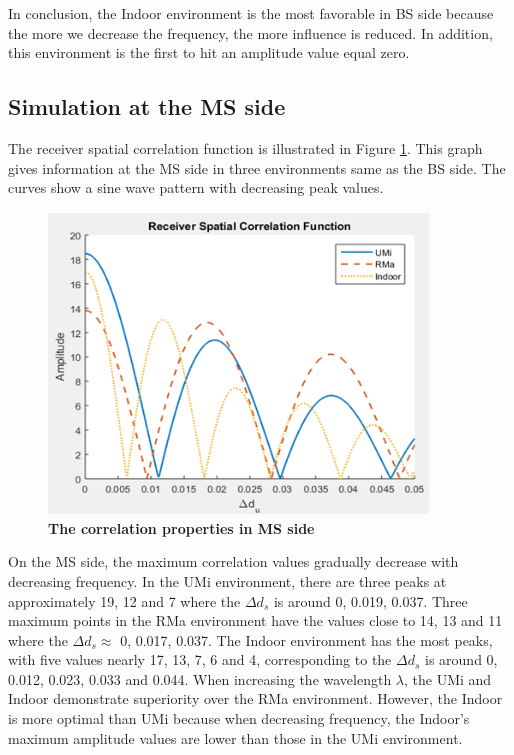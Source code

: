 \documentclass{article} %
\begin{document}
In conclusion, the Indoor environment is the most favorable in BS side because the more we decrease the frequency, the more influence is reduced. In addition, this environment is the first to hit an amplitude value equal zero.

\subsection{Simulation at the MS side}
The receiver spatial correlation function is illustrated in Figure \ref{figure3}. This graph gives information at the MS side in three environments same as the BS side. The curves show a sine wave pattern with decreasing peak values.

\begin{figure}[!ht]
    \centering
    \includegraphics[height=8cm]{Images/figure3.png}
    \caption[The correlation properties in MS side~\cite{final_exam}]{\bfseries \fontsize{12pt}{0pt}\selectfont The correlation properties in MS side~\cite{final_exam}}
    \label{figure3}
\end{figure}

On the MS side, the maximum correlation values gradually decrease with decreasing frequency. In the UMi environment, there are three peaks at approximately 19, 12 and 7 where the $\Delta d_s$ is around 0, 0.019, 0.037. Three maximum points in the RMa environment have the values close to 14, 13 and 11 where the $\Delta d_s \approx$ 0, 0.017, 0.037. The Indoor environment has the most peaks, with five values nearly 17, 13, 7, 6 and 4, corresponding to the $\Delta d_s$ is around 0, 0.012, 0.023, 0.033 and 0.044. When increasing the wavelength $\lambda$, the UMi and Indoor demonstrate superiority over the RMa environment. However, the Indoor is more optimal than UMi because when decreasing frequency, the Indoor’s maximum amplitude values are lower than those in the UMi environment.
\end{document}
